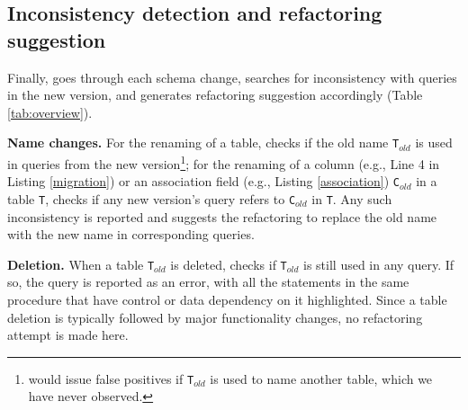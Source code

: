 \subsection{Inconsistency detection and refactoring suggestion}  
Finally, 
\Tool{} goes through each schema change, searches for inconsistency with
 queries in the new version, and generates refactoring suggestion accordingly
 (Table \ref{tab:overview}).



\textbf{Name changes.} 
For the renaming of a table, \Tool{} checks if 
the old name \texttt{T}$_{{old}}$ is used in queries
from the new version\footnote{\Tool would issue false positives if 
\texttt{T}$_{old}$ is used to name another
table, which we have never observed.}; for the renaming of a column 
(e.g., Line 4 in Listing \ref{migration})
or an 
association field (e.g., Listing \ref{association}) \texttt{C}$_{{old}}$ in
a table \texttt{T}, \Tool checks if any new version's query refers to  
\texttt{C}$_{{old}}$ in \texttt{T}. Any such inconsistency is reported and
\Tool suggests the refactoring to replace the old name with the new name in
corresponding queries.
 



\textbf{Deletion.} 
When a table \texttt{T}$_{old}$ is deleted, 
\Tool checks if  \texttt{T}$_{old}$ is still used in any query. If so, the query is 
reported as an error, with all the
statements in the same procedure that have control or data dependency on it 
highlighted. Since a table deletion is typically followed by major 
functionality changes, no refactoring attempt is made here. %


